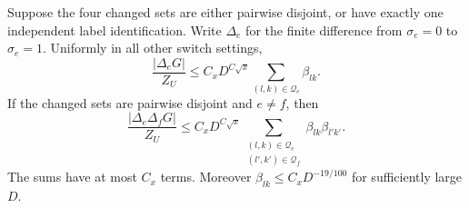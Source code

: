 \begin{lemma}
\label{lem:local-switches}
Suppose the four changed sets are either pairwise disjoint, or have
exactly one independent label identification.  Write $\Delta_e$ for
the finite difference from $\sigma_e=0$ to $\sigma_e=1$.  Uniformly
in all other switch settings,
\begin{equation}\label{eq:local-one-switch}
 \frac{|\Delta_eG|}{Z_U}
       \le C_xD^{C\sqrt x}\sum_{(l,k)\in\mathcal Q_e}\beta_{lk}.
\end{equation}
If the changed sets are pairwise disjoint and $e\ne f$, then
\begin{equation}\label{eq:local-two-switches}
 \frac{|\Delta_e\Delta_fG|}{Z_U}
   \le C_xD^{C\sqrt x}
       \sum_{\substack{(l,k)\in\mathcal Q_e\\
                       (l',k')\in\mathcal Q_f}}
                                 \beta_{lk}\beta_{l'k'}.
\end{equation}
The sums have at most $C_x$ terms.  Moreover
$\beta_{lk}\le C_xD^{-19/100}$ for sufficiently large $D$.
\end{lemma}


